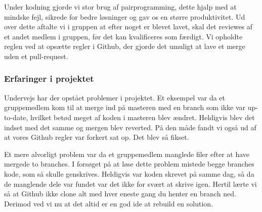 Under kodning gjorde vi stor brug af pairprogramming, dette hjalp med at mindske fejl, sikrede for bedre løsninger og gav os en større produktivitet.
Ud over dette aftalte vi i gruppen at efter noget er blevet lavet, 
skal det reviewes af et andet medlem i gruppen, før det kan kvalificeres som færdigt. Vi opholdte reglen ved at opsætte regler i Github, der gjorde det umuligt at lave et merge uden et pull-request.

\subsubsection{Erfaringer i projektet}

Undervejs har der opstået problemer i projektet. Et eksempel var da et gruppemedlem kom til at merge ind på masteren med en branch som ikke var up-to-date, hvilket betød meget af koden i masteren blev ændret. Heldigvis blev det indset med det samme og mergen blev reverted. På den måde fandt vi også ud af at vores Github regler var forkert sat op. Det blev så fikset.

Et mere alvorligt problem var da et gruppemedlem manglede filer efter at have mergede to branches. I forsøget på at løse dette problem mistede begge branches kode, som så skulle genskrives. Heldigvis var koden skrevet på samme dag, så da de manglende dele var fundet var det ikke for svært at skrive igen. Hertil lærte vi så at Github ikke clone alt med hver eneste gang du henter en branch ned. Derimod ved vi nu at det altid er en god ide at rebuild en solution.